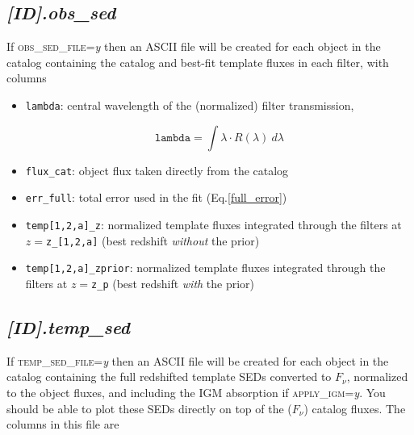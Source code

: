 \documentclass[11pt]{article}
\begin{document}
  \subsection{\textsl{[ID].}\textit{obs\_sed} \label{obs_sed}}
  
  If \textsc{obs\_sed\_file}=\textsl{y} then an ASCII file will be created for each
  object in the catalog containing the catalog and best-fit template fluxes in each filter, with columns
  
  \begin{itemize}
  
    \item \texttt{lambda}: central wavelength of the (normalized) filter transmission,

    \begin{equation} \texttt{lambda} = \int \lambda\cdot R(\lambda)\ d\lambda \end{equation}

    \item \texttt{flux\_cat}: object flux taken directly from the catalog

    \item \texttt{err\_full}: total error used in the fit (Eq.\ref{full_error})

    \item \texttt{temp[1,2,a]\_z}: normalized template fluxes integrated through the filters at $z=$\texttt{z\_[1,2,a]} (best redshift \textit{without} the prior)

    \item \texttt{temp[1,2,a]\_zprior}: normalized template fluxes integrated through the filters at $z=$\texttt{z\_p} (best redshift \textit{with} the prior)
    
  \end{itemize}
  
  \subsection{\textsl{[ID].}\textit{temp\_sed} \label{temp_sed}}

  If \textsc{temp\_sed\_file}=\textsl{y} then an ASCII file will be created for
  each object in the catalog containing the full redshifted template SEDs
  converted to $F_\nu$, normalized to the object fluxes, and including the IGM
  absorption if \textsc{apply\_igm}=\textsl{y}.  You should be able to plot
  these SEDs directly on top of the ($F_\nu$) catalog fluxes.  The columns in
  this file are
    
\end{document}
